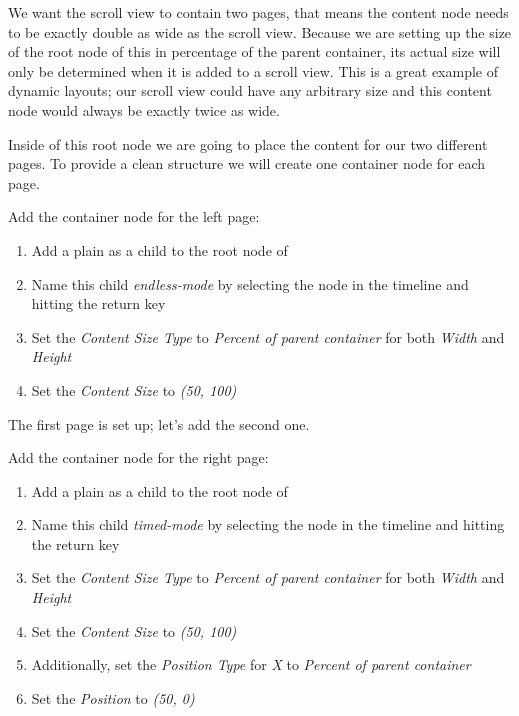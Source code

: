 We want the scroll view to contain two pages, that means the content node needs
to be exactly double as wide as the scroll view. Because we are setting up the
size of the root node of this \ccbfile{} in percentage of the parent container,
its actual size will only be determined when it is added to a scroll view. This
is a great example of dynamic layouts; our scroll view could have any
arbitrary size and this content node would always be exactly twice as wide.

Inside of this root node we are going to place the content for our two different
pages. To provide a clean structure we will create one container node for each
page.

\begin{leftbar}
Add the container node for the left page:
\begin{enumerate}
  \item Add a plain \ccnode{} as a child to the root node of
  \item Name this child \textit{endless-mode} by selecting the node in the timeline and
 hitting the return key
  \item Set the \textit{Content Size Type} to \textit{Percent of parent
  container} for both \textit{Width} and \textit{Height}
  \item Set the \textit{Content Size} to \textit{(50, 100)}
\end{enumerate}
\end{leftbar}

The first page is set up; let's add the second one.

\begin{leftbar}
Add the container node for the right page:
\begin{enumerate}
  \item Add a plain \ccnode{} as a child to the root node of
  \item Name this child \textit{timed-mode} by selecting the node in the
  timeline and hitting the return key
  \item Set the \textit{Content Size Type} to \textit{Percent of parent
  container} for both \textit{Width} and \textit{Height}
  \item Set the \textit{Content Size} to \textit{(50, 100)}
  \item Additionally, set the \textit{Position Type} for \textit{X} to
  \textit{Percent of parent container}
  \item Set the \textit{Position} to \textit{(50, 0)}
\end{enumerate}
\end{leftbar}


